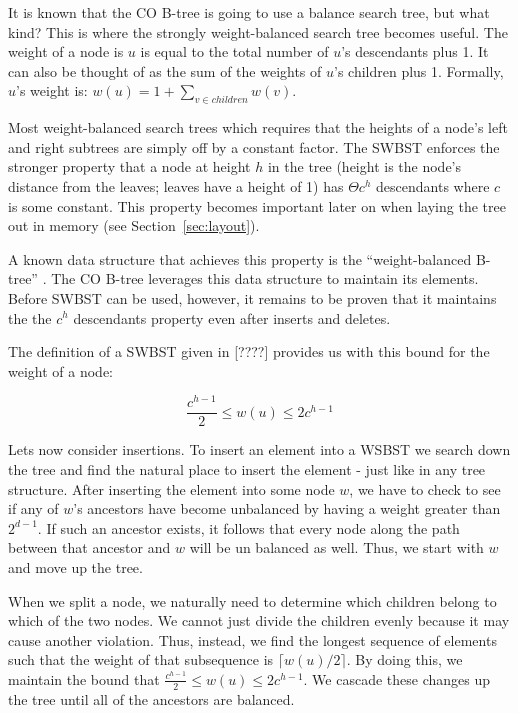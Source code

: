 \documentclass{style}
\begin{document}
It is known that the CO B-tree is going to use a balance search tree, but what
kind? This is where the strongly weight-balanced search tree becomes useful. The
weight of a node is $u$ is equal to the total number of $u$'s descendants plus
1. It can also be thought of as the sum of the weights of $u$'s children plus
1. Formally, $u$'s weight is: $w(u) = 1 + \sum_{v \in children} w(v)$.

Most weight-balanced search trees which requires that the heights of a node's
left and right subtrees are simply off by a constant factor. The SWBST enforces the
stronger property that a node at height $h$ in the tree (height is the node's
distance from the leaves; leaves have a height of 1) has $\Theta c^h$
descendants where $c$ is some constant. This property becomes important later
on when laying the tree out in memory (see Section~\ref{sec:layout}).

A known data structure that achieves this property is the ``weight-balanced
B-tree'' \cite{????}. The CO B-tree leverages this data structure to maintain
its elements. Before SWBST can be used, however, it remains to be proven that
it maintains the the $c^h$ descendants property even after inserts and
deletes.

The definition of a SWBST given in [????] provides us with this bound for the
weight of a node:

\begin{equation}
\frac{c^{h-1}}{2} \leq w(u) \leq 2c^{h-1}
\end{equation}

Lets now consider insertions. To insert an element into a WSBST we search down
the tree and find the natural place to insert the element - just like in any
tree structure. After inserting the element into some node $w$, we have to
check to see if any of $w$'s ancestors have become unbalanced by having a
weight greater than $2^{d-1}$. If such an ancestor exists, it follows that
every node along the path between that ancestor and $w$ will be un balanced as
well. Thus, we start with $w$ and move up the tree.

When we split a node, we naturally need to determine which children belong to
which of the two nodes. We cannot just divide the children evenly because it
may cause another violation. Thus, instead, we find the longest sequence of
elements such that the weight of that subsequence is $\lceil w(u)/2 \rceil$.
By doing this, we maintain the bound that $\frac{c^{h-1}}{2} \leq w(u) \leq
2c^{h-1}$. We cascade these changes up the tree until all of the ancestors
are balanced.
\end{document}
